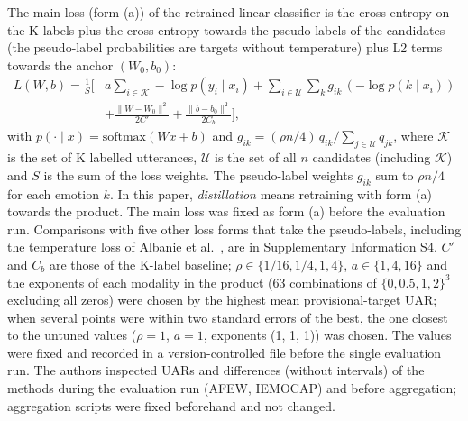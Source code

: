 The main loss (form (a)) of the retrained linear classifier is the cross-entropy on the K labels plus the cross-entropy towards the pseudo-labels of the candidates (the pseudo-label probabilities are targets without temperature) plus L2 terms towards the anchor $(W_0,b_0)$:
\begin{equation}
\begin{split}
L(W,b)=\frac{1}{S}\Big[&a\sum_{i\in\mathcal{K}}-\log p(y_i\mid x_i)+\sum_{i\in\mathcal{U}}\sum_k g_{ik}\,(-\log p(k\mid x_i))\\
&+\frac{\|W-W_0\|^2}{2C'}+\frac{\|b-b_0\|^2}{2C_b}\Big],
\end{split}
\end{equation}
with $p(\cdot\mid x)=\mathrm{softmax}(Wx+b)$ and $g_{ik}=(\rho n/4)\,q_{ik}/\sum_{j\in\mathcal{U}}q_{jk}$, where $\mathcal{K}$ is the set of K labelled utterances, $\mathcal{U}$ is the set of all $n$ candidates (including $\mathcal{K}$) and $S$ is the sum of the loss weights. The pseudo-label weights $g_{ik}$ sum to $\rho n/4$ for each emotion $k$. In this paper, \emph{distillation} means retraining with form (a) towards the product. The main loss was fixed as form (a) before the evaluation run. Comparisons with five other loss forms that take the pseudo-labels, including the temperature loss of Albanie et al.\ \cite{hinton2015distilling,albanie2018}, are in Supplementary Information S4. $C'$ and $C_b$ are those of the K-label baseline; $\rho\in\{1/16,1/4,1,4\}$, $a\in\{1,4,16\}$ and the exponents of each modality in the product (63 combinations of $\{0,0.5,1,2\}^3$ excluding all zeros) were chosen by the highest mean provisional-target UAR; when several points were within two standard errors of the best, the one closest to the untuned values ($\rho=1$, $a=1$, exponents (1, 1, 1)) was chosen. The values were fixed and recorded in a version-controlled file before the single evaluation run. The authors inspected UARs and differences (without intervals) of the methods during the evaluation run (AFEW, IEMOCAP) and before aggregation; aggregation scripts were fixed beforehand and not changed.

